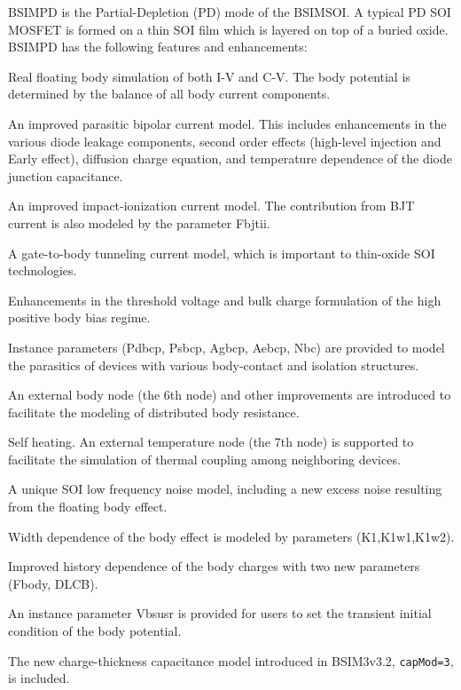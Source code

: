 BSIMPD is the
Partial-Depletion (PD) mode of the BSIMSOI.  A typical PD SOI MOSFET is formed
on a thin SOI film which is layered on top of a buried oxide.  BSIMPD has
the following features and enhancements:
\begin{XyceItemize}
\item Real floating body simulation of both I-V and C-V.  The body potential is
      determined by the balance of all body current components.
\item An improved parasitic bipolar current model.  This includes enhancements in
      the various diode leakage components, second order effects (high-level
      injection and Early effect), diffusion charge equation, and temperature
      dependence of the diode junction capacitance.
\item An improved impact-ionization current model.  The contribution from BJT
      current is also modeled by the parameter Fbjtii.
\item A gate-to-body tunneling current model, which is important to thin-oxide
      SOI technologies.
\item Enhancements in the threshold voltage and bulk charge formulation of the
      high positive body bias regime.
\item Instance parameters (Pdbcp, Psbcp, Agbcp, Aebcp, Nbc) are provided to model
      the parasitics of devices with various body-contact and isolation structures.
\item An external body node (the 6th node) and other improvements are introduced
      to facilitate the modeling of distributed body resistance.
\item Self heating.  An external temperature node (the 7th node) is supported to
      facilitate the simulation of thermal coupling among neighboring devices.
\item A unique SOI low frequency noise model, including a new excess noise resulting
      from the floating body effect.
\item Width dependence of the body effect is modeled by parameters (K1,K1w1,K1w2).
\item Improved history dependence of the body charges with two new parameters
      (Fbody, DLCB).
\item An instance parameter Vbsusr is provided for users to set the transient initial
      condition of the body potential.
\item The new charge-thickness capacitance model introduced in BSIM3v3.2,
      \texttt{capMod=3}, is included.
\end{XyceItemize}


